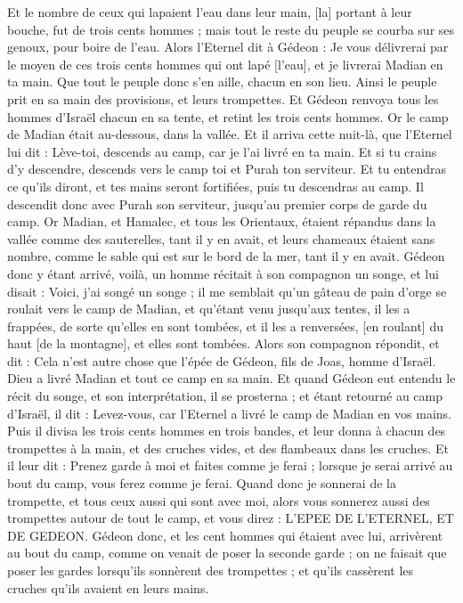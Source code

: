 \begin{multicols}{2}
Et le nombre de ceux qui lapaient l'eau dans leur main, [la] portant à leur bouche, fut de trois cents hommes ; mais tout le reste du peuple se courba sur ses genoux, pour boire de l'eau.
Alors l'Eternel dit à Gédeon : Je vous délivrerai par le moyen de ces trois cents hommes qui ont lapé [l'eau], et je livrerai Madian en ta main. Que tout le peuple donc s'en aille, chacun en son lieu.
Ainsi le peuple prit en sa main des provisions, et leurs trompettes. Et Gédeon renvoya tous les hommes d'Israël chacun en sa tente, et retint les trois cents hommes. Or le camp de Madian était au-dessous, dans la vallée.
Et il arriva cette nuit-là, que l'Eternel lui dit : Lève-toi, descends au camp, car je l'ai livré en ta main.
Et si tu crains d'y descendre, descends vers le camp toi et Purah ton serviteur.
Et tu entendras ce qu'ils diront, et tes mains seront fortifiées, puis tu descendras au camp. Il descendit donc avec Purah son serviteur, jusqu'au premier corps de garde du camp.
Or Madian, et Hamalec, et tous les Orientaux, étaient répandus dans la vallée comme des sauterelles, tant il y en avait, et leurs chameaux étaient sans nombre, comme le sable qui est sur le bord de la mer, tant il y en avait.
Gédeon donc y étant arrivé, voilà, un homme récitait à son compagnon un songe, et lui disait : Voici, j'ai songé un songe ; il me semblait qu'un gâteau de pain d'orge se roulait vers le camp de Madian, et qu'étant venu jusqu'aux tentes, il les a frappées, de sorte qu'elles en sont tombées, et il les a renversées, [en roulant] du haut [de la montagne], et elles sont tombées.
Alors son compagnon répondit, et dit : Cela n'est autre chose que l'épée de Gédeon, fils de Joas, homme d'Israël. Dieu a livré Madian et tout ce camp en sa main.
Et quand Gédeon eut entendu le récit du songe, et son interprétation, il se prosterna ; et étant retourné au camp d'Israël, il dit : Levez-vous, car l'Eternel a livré le camp de Madian en vos mains.
Puis il divisa les trois cents hommes en trois bandes, et leur donna à chacun des trompettes à la main, et des cruches vides, et des flambeaux dans les cruches.
Et il leur dit : Prenez garde à moi et faites comme je ferai ; lorsque je serai arrivé au bout du camp, vous ferez comme je ferai.
Quand donc je sonnerai de la trompette, et tous ceux aussi qui sont avec moi, alors vous sonnerez aussi des trompettes autour de tout le camp, et vous direz : L'EPEE DE L'ETERNEL, ET DE GEDEON.
Gédeon donc, et les cent hommes qui étaient avec lui, arrivèrent au bout du camp, comme on venait de poser la seconde garde ; on ne faisait que poser les gardes lorsqu'ils sonnèrent des trompettes ; et qu'ils cassèrent les cruches qu'ils avaient en leurs mains.

\end{multicols}
